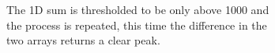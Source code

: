 \documentclass[10pt]{scrartcl}
\begin{document}
\begin{figure}[!ht]
\begin{subfigure}[b]{.5\linewidth}
        \caption{The 1D sum is thresholded to be only above 1000 and the process is repeated, this time the difference in the two arrays returns a clear peak.}
        \label{small_image_fixed}
    \end{subfigure}
    \caption{}
    \label{fix_small}
\end{figure}



\end{document}
